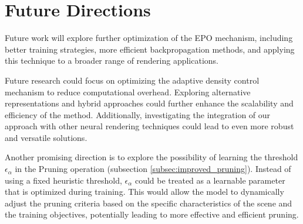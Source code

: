 \documentclass[11pt]{report}
\begin{document}
\section{Future Directions}

Future work will explore further optimization of the EPO mechanism, including better training strategies, more efficient backpropagation methods, and applying this technique to a broader range of rendering applications.

Future research could focus on optimizing the adaptive density control mechanism to reduce computational overhead. Exploring alternative representations and hybrid approaches could further enhance the scalability and efficiency of the method. Additionally, investigating the integration of our approach with other neural rendering techniques could lead to even more robust and versatile solutions.

Another promising direction is to explore the possibility of learning the threshold $\epsilon_\alpha$ in the Pruning operation (subsection \ref{subsec:improved_pruning}). Instead of using a fixed heuristic threshold, $\epsilon_\alpha$ could be treated as a learnable parameter that is optimized during training. This would allow the model to dynamically adjust the pruning criteria based on the specific characteristics of the scene and the training objectives, potentially leading to more effective and efficient pruning.
\end{document}
